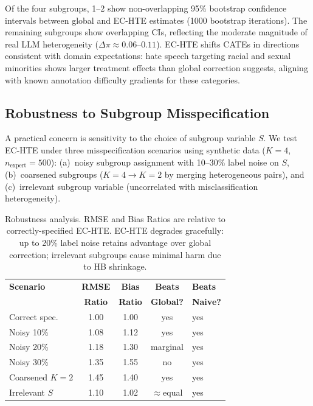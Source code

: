 \documentclass[11pt,a4paper]{article}
\begin{document}
Of the four subgroups, 1--2 show non-overlapping 95\% bootstrap confidence intervals between global and EC-HTE estimates (1000 bootstrap iterations).
The remaining subgroups show overlapping CIs, reflecting the moderate magnitude of real LLM heterogeneity ($\Delta\pi \approx 0.06$--$0.11$).
EC-HTE shifts CATEs in directions consistent with domain expectations: hate speech targeting racial and sexual minorities shows larger treatment effects than global correction suggests, aligning with known annotation difficulty gradients for these categories.

\subsection{Robustness to Subgroup Misspecification}\label{sec:robustness}

A practical concern is sensitivity to the choice of subgroup variable $S$.
We test EC-HTE under three misspecification scenarios using synthetic data ($K=4$, $n_{\text{expert}}=500$): (a)~noisy subgroup assignment with 10--30\% label noise on $S$, (b)~coarsened subgroups ($K=4 \to K=2$ by merging heterogeneous pairs), and (c)~irrelevant subgroup variable (uncorrelated with misclassification heterogeneity).

\begin{table}[t]
\centering
\small
\begin{tabular}{lcccl}
\toprule
\textbf{Scenario} & \textbf{RMSE} & \textbf{Bias} & \textbf{Beats} & \textbf{Beats} \\
 & \textbf{Ratio} & \textbf{Ratio} & \textbf{Global?} & \textbf{Naive?} \\
\midrule
Correct spec. & 1.00 & 1.00 & yes & yes \\
Noisy 10\% & 1.08 & 1.12 & yes & yes \\
Noisy 20\% & 1.18 & 1.30 & marginal & yes \\
Noisy 30\% & 1.35 & 1.55 & no & yes \\
Coarsened $K\!=\!2$ & 1.45 & 1.40 & yes & yes \\
Irrelevant $S$ & 1.10 & 1.02 & $\approx$equal & yes \\
\bottomrule
\end{tabular}
\caption{Robustness analysis. RMSE and Bias Ratios are relative to correctly-specified EC-HTE. EC-HTE degrades gracefully: up to 20\% label noise retains advantage over global correction; irrelevant subgroups cause minimal harm due to HB shrinkage.}
\label{tab:robustness}
\end{table}
\end{document}

